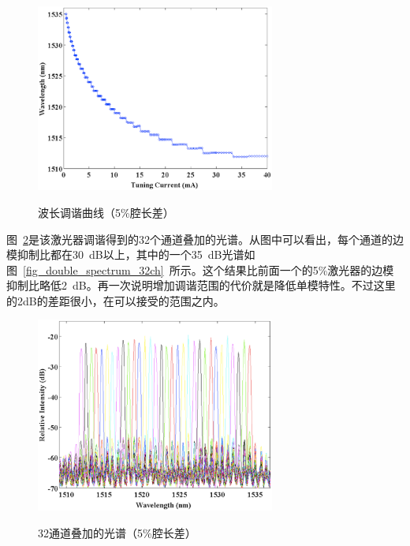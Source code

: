 \documentclass{ZJUthesis}
\begin{document}
\begin{figure}[htbp]
  \centering
  \includegraphics[width=0.7\textwidth]{./Pictures/double_tuning_32ch.eps}\\
  \caption{波长调谐曲线（5\%腔长差）}
  \label{fig_double_tuning_32ch}
\end{figure}

图~\ref{fig_double_spectra_32ch}是该激光器调谐得到的32个通道叠加的光谱。从图中可以看出，每个通道的边模抑制比都在30~dB以上，其中的一个35~dB光谱如图~\ref{fig_double_spectrum_32ch}~所示。这个结果比前面一个的5\%激光器的边模抑制比略低2~dB。再一次说明增加调谐范围的代价就是降低单模特性。不过这里的2dB的差距很小，在可以接受的范围之内。

\begin{figure}[htbp]
  \centering
  \includegraphics[width=0.7\textwidth]{./Pictures/double_spectra_32ch.eps}\\
  \caption{32通道叠加的光谱（5\%腔长差）}
  \label{fig_double_spectra_32ch}
\end{figure}
\end{document}
